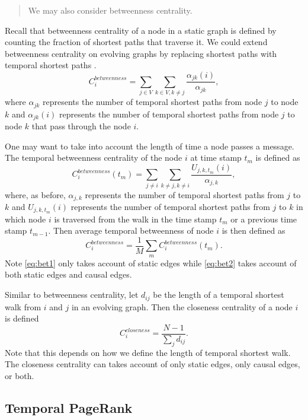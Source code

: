 \documentclass[12pt]{article}
\theoremstyle{definition}
\newenvironment{wz}{\begin{quote}\small\sf{\color{green}$\diamondsuit$~WZ~}}{\end{quote}}
\begin{document}
\begin{wz}
  We may also consider betweenness centrality.
\end{wz}

Recall that betweenness centrality of a node in a static graph is defined by counting the fraction of shortest paths that traverse it.
We could extend
betweenness centrality on evolving graphs by replacing shortest paths with temporal shortest paths \cite{nicosia13}.
\begin{equation}
  \label{eq:bet1}
C_i^{betweenness} = \sum_{j \in V}\sum_{k \in V, k \ne j}\frac{\alpha_{jk}(i)}{\alpha_{jk}},
\end{equation}
where $\alpha_{jk}$ represents the number of temporal shortest paths from node $j$ to node $k$ and $\alpha_{jk}(i)$ represents the number of temporal shortest paths from node $j$ to node $k$ that pass through the node $i$.

One may want to take into account the length of time a node passes a message. The temporal betweenness centrality of the node $i$ at time stamp $t_m$ is defined as
\begin{equation}
  \label{eq:bet2}
  C_i^{betweenness}(t_m) = \sum_{j\ne i}\sum_{k\ne j, k\ne i}\frac{U_{j,k,t_m}(i)}{\alpha_{j,k}},
\end{equation}
where, as before, $\alpha_{j,k}$ represents the number of temporal shortest paths from $j$ to $k$ and $U_{j,k,t_m}(i)$ represents the number of temporal shortest paths from $j$ to $k$ in which node $i$ is traversed from
the walk in the time stamp $t_m$ or a previous time stamp $t_{m-1}$. Then
average temporal betweenness of node $i$ is then defined as
$$
  C_i^{betweenness} = \frac{1}{M}\sum_m C_i^{betweenness}(t_m).
$$
Note \eqref{eq:bet1} only takes account of static edges while \eqref{eq:bet2} takes account of both static edges and causal edges.

Similar to betweenness centrality, let $d_{ij}$ be the length of a temporal shortest walk from $i$ and $j$ in an evolving graph. Then
the closeness centrality of a node $i$ is defined
$$
C_i^{closeness} = \frac{N-1}{\sum_j d_{ij}}.
$$
Note that this depends on how we define the length of temporal shortest walk. The closeness centrality can takes account of only static edges, only causal edges, or both.


\subsection{Temporal PageRank}
\end{document}
